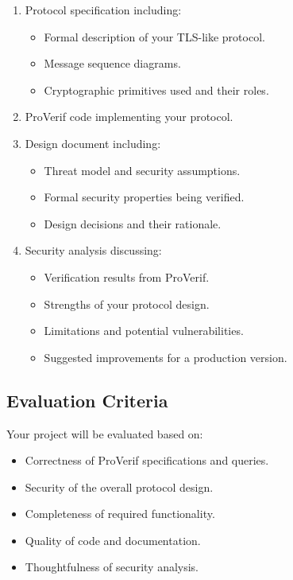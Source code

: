 \documentclass[10pt,a4paper,american]{exam}
\begin{document}
\begin{enumerate}
	\item Protocol specification including:
	      \begin{itemize}
		      \item Formal description of your TLS-like protocol.
		      \item Message sequence diagrams.
		      \item Cryptographic primitives used and their roles.
	      \end{itemize}
	\item ProVerif code implementing your protocol.
	\item Design document including:
	      \begin{itemize}
		      \item Threat model and security assumptions.
		      \item Formal security properties being verified.
		      \item Design decisions and their rationale.
	      \end{itemize}
	\item Security analysis discussing:
	      \begin{itemize}
		      \item Verification results from ProVerif.
		      \item Strengths of your protocol design.
		      \item Limitations and potential vulnerabilities.
		      \item Suggested improvements for a production version.
	      \end{itemize}
\end{enumerate}

\subsection*{Evaluation Criteria}
Your project will be evaluated based on:

\begin{itemize}
	\item Correctness of ProVerif specifications and queries.
	\item Security of the overall protocol design.
	\item Completeness of required functionality.
	\item Quality of code and documentation.
	\item Thoughtfulness of security analysis.
\end{itemize}
\end{document}
